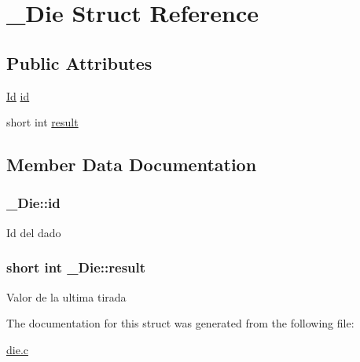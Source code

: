 \hypertarget{struct__Die}{\section{\+\_\+\+Die Struct Reference}
\label{struct__Die}
}
\subsection*{Public Attributes}
\begin{DoxyCompactItemize}
\item 
\hyperlink{types_8h_a845e604fb28f7e3d97549da3448149d3}{Id} \hyperlink{struct__Die_a0887af562dda760409957f13619d36f1}{id}
\item 
short int \hyperlink{struct__Die_a93f9aa650af74c81ab2377ceb7324250}{result}
\end{DoxyCompactItemize}


\subsection{Member Data Documentation}
\hypertarget{struct__Die_a0887af562dda760409957f13619d36f1}{
\subsubsection[{id}]{ \+\_\+\+Die\+::id}}\label{struct__Die_a0887af562dda760409957f13619d36f1}
Id del dado \hypertarget{struct__Die_a93f9aa650af74c81ab2377ceb7324250}{
\subsubsection[{result}]{\setlength{\rightskip}{0pt plus 5cm}short int \+\_\+\+Die\+::result}}\label{struct__Die_a93f9aa650af74c81ab2377ceb7324250}
Valor de la ultima tirada 

The documentation for this struct was generated from the following file\+:\begin{DoxyCompactItemize}
\item 
\hyperlink{die_8c}{die.\+c}\end{DoxyCompactItemize}
